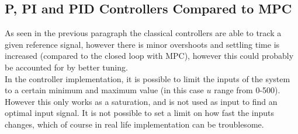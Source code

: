 \subsection{P, PI and PID Controllers Compared to MPC}
As seen in the previous paragraph the classical controllers are able to track a given reference signal, however there is minor overshoots and settling time is increased (compared to the closed loop with MPC), however this could probably be accounted for by better tuning.\\
In the controller implementation, it is possible to limit the inputs of the system to a certain minimum and maximum value (in this case $u$ range from 0-500). However this only works as a saturation, and is not used as input to find an optimal input signal. It is not possible to set a limit on how fast the inputs changes, which of course in real life implementation can be troublesome.\\
